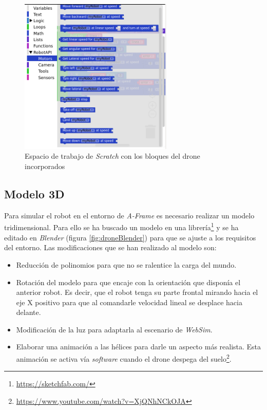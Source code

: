         \begin{figure}[H]
            \centering
            \includegraphics[width=0.65\textwidth]{img/kibotics_newblocks.png}
            \caption{Espacio de trabajo de \textit{Scratch} con los bloques del drone incorporados} 
            \label{fig:newblocks}
        \end{figure}

\subsection{Modelo 3D}

Para simular el robot en el entorno de \textit{A-Frame} es necesario realizar un modelo tridimensional. Para ello se ha buscado un modelo en una librería\footnote{\url{https://sketchfab.com/}} y se ha editado en \textit{Blender} (figura \ref{fig:droneBlender}) para que se ajuste a los requisitos del entorno. Las modificaciones que se han realizado al modelo son: 
\begin{itemize}
    \item Reducción de polinomios  para que no se ralentice la carga del mundo.
    \item Rotación del modelo para que encaje con la orientación que disponía el anterior robot. Es decir, que el robot tenga su parte frontal mirando hacia el eje X positivo para que al comandarle velocidad lineal se desplace hacia delante.
    \item Modificación de la luz para adaptarla al escenario de \textit{WebSim}. 
    
    \item Elaborar una animación a las hélices para darle un aspecto más realista. Esta animación se activa vía \textit{software} cuando el drone despega del suelo\footnote{\url{https://www.youtube.com/watch?v=XjQNhNCkOJA}}.
\end{itemize}

